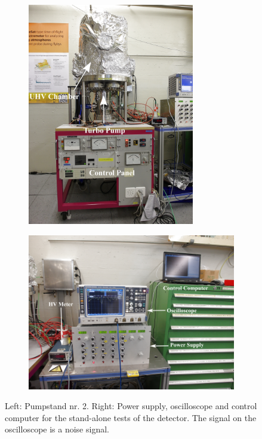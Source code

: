 		
		\begin{figure}[h]
			\begin{subfigure}{.5\textwidth}
				\centering
				\includegraphics[width=0.8\textwidth]{Bilder/Galerie_Setup/Pumpstand2_midres.png}
			\end{subfigure}
			\begin{subfigure}{.5\textwidth}
				\centering
				\includegraphics[width=\textwidth]{Bilder/Galerie_Setup/Pumpstand_PSOszi.png}
			\end{subfigure}
			\caption{Left: Pumpstand nr. 2. Right: Power supply, oscilloscope and control computer for the stand-alone tests of the detector. The signal on the oscilloscope is a noise signal.}
			\label{fig:Pumpstand2}
		\end{figure}
		
